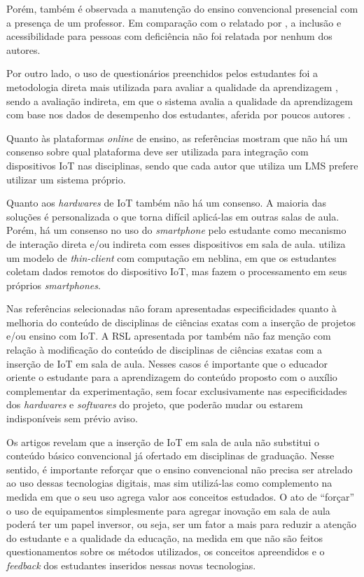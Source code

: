 \documentclass[portuguese]{textolivre}
\begin{document}
Porém, também é observada a manutenção do ensino convencional presencial com a presença de um professor. Em comparação com o relatado por \textcite{lopes_smart_2018}, a inclusão e acessibilidade para pessoas com deficiência não foi relatada por nenhum dos autores. 

Por outro lado, o uso de questionários preenchidos pelos estudantes foi a metodologia direta mais utilizada para avaliar a qualidade da aprendizagem \cite{shan_smart_2020,oteri_application_2020,fortoul-diaz_project-based_2021,petrovic_designing_2021,liu_internet_2021,hincapie_use_2020,burunkaya_design_2022}, sendo a avaliação indireta, em que o sistema avalia a qualidade da aprendizagem com base nos dados de desempenho dos estudantes, aferida por poucos autores \cite{nai_design_2022}.

Quanto às plataformas \textit{online} de ensino, as referências mostram que não há um consenso sobre qual plataforma deve ser utilizada para integração com dispositivos IoT nas disciplinas, sendo que cada autor que utiliza um LMS prefere utilizar um sistema próprio. 

Quanto aos \textit{hardwares} de IoT também não há um consenso. A maioria das soluções é personalizada o que torna difícil aplicá-las em outras salas de aula. Porém, há um consenso no uso do \textit{smartphone} pelo estudante como mecanismo de interação direta e/ou indireta com esses dispositivos em sala de aula. \textcite{saraubon_learning_2019} utiliza um modelo de \textit{thin-client} com computação em neblina, em que os estudantes coletam dados remotos do dispositivo IoT, mas fazem o processamento em seus próprios \textit{smartphones}.

Nas referências selecionadas não foram apresentadas especificidades quanto à melhoria do conteúdo de disciplinas de ciências exatas com a inserção de projetos e/ou ensino com IoT. A RSL apresentada por \textcite{lopes_smart_2018} também não faz menção com relação à modificação do conteúdo de disciplinas de ciências exatas com a inserção de IoT em sala de aula. Nesses casos é importante que o educador oriente o estudante para a aprendizagem do conteúdo proposto com o auxílio complementar da experimentação, sem focar exclusivamente nas especificidades dos \textit{hardwares} e \textit{softwares} do projeto, que poderão mudar ou estarem indisponíveis sem prévio aviso.

Os artigos revelam que a inserção de IoT em sala de aula não substitui o conteúdo básico convencional já ofertado em disciplinas de graduação. Nesse sentido, é importante reforçar que o ensino convencional não precisa ser atrelado ao uso dessas tecnologias digitais, mas sim utilizá-las como complemento na medida em que o seu uso agrega valor aos conceitos estudados. O ato de “forçar” o uso de equipamentos simplesmente para agregar inovação em sala de aula poderá ter um papel inversor, ou seja, ser um fator a mais para reduzir a atenção do estudante e a qualidade da educação, na medida em que não são feitos questionamentos sobre os métodos utilizados, os conceitos apreendidos e o \textit{feedback} dos estudantes inseridos nessas novas tecnologias. 
\end{document}

